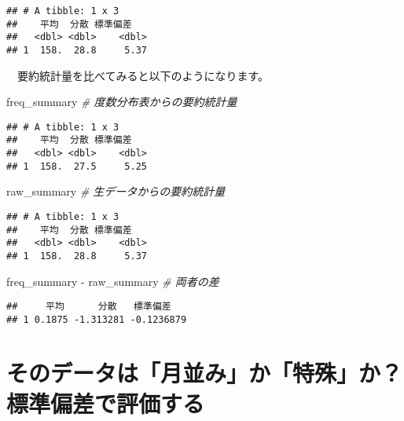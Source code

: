\documentclass[
  12pt,
]{book}
\newenvironment{Shaded}{\begin{snugshade}}{\end{snugshade}}
\newcommand{\CommentTok}[1]{\textcolor[rgb]{0.56,0.35,0.01}{\textit{#1}}}
\newcommand{\NormalTok}[1]{#1}
\newcommand{\SpecialCharTok}[1]{\textcolor[rgb]{0.00,0.00,0.00}{#1}}
\begin{document}
\begin{verbatim}
## # A tibble: 1 x 3
##    平均  分散 標準偏差
##   <dbl> <dbl>    <dbl>
## 1  158.  28.8     5.37
\end{verbatim}

　要約統計量を比べてみると以下のようになります。

\begin{Shaded}
\begin{Highlighting}[]
\NormalTok{freq\_summary }\CommentTok{\# 度数分布表からの要約統計量}
\end{Highlighting}
\end{Shaded}

\begin{verbatim}
## # A tibble: 1 x 3
##    平均  分散 標準偏差
##   <dbl> <dbl>    <dbl>
## 1  158.  27.5     5.25
\end{verbatim}

\begin{Shaded}
\begin{Highlighting}[]
\NormalTok{raw\_summary  }\CommentTok{\# 生データからの要約統計量}
\end{Highlighting}
\end{Shaded}

\begin{verbatim}
## # A tibble: 1 x 3
##    平均  分散 標準偏差
##   <dbl> <dbl>    <dbl>
## 1  158.  28.8     5.37
\end{verbatim}

\begin{Shaded}
\begin{Highlighting}[]
\NormalTok{freq\_summary }\SpecialCharTok{{-}}\NormalTok{ raw\_summary }\CommentTok{\# 両者の差}
\end{Highlighting}
\end{Shaded}

\begin{verbatim}
##     平均      分散   標準偏差
## 1 0.1875 -1.313281 -0.1236879
\end{verbatim}

\hypertarget{ux305dux306eux30c7ux30fcux30bfux306fux6708ux4e26ux307fux304bux7279ux6b8aux304b-ux6a19ux6e96ux504fux5deeux3067ux8a55ux4fa1ux3059ux308b}{%
\chapter{そのデータは「月並み」か「特殊」か？ 標準偏差で評価する}\label{ux305dux306eux30c7ux30fcux30bfux306fux6708ux4e26ux307fux304bux7279ux6b8aux304b-ux6a19ux6e96ux504fux5deeux3067ux8a55ux4fa1ux3059ux308b}}
\end{document}
